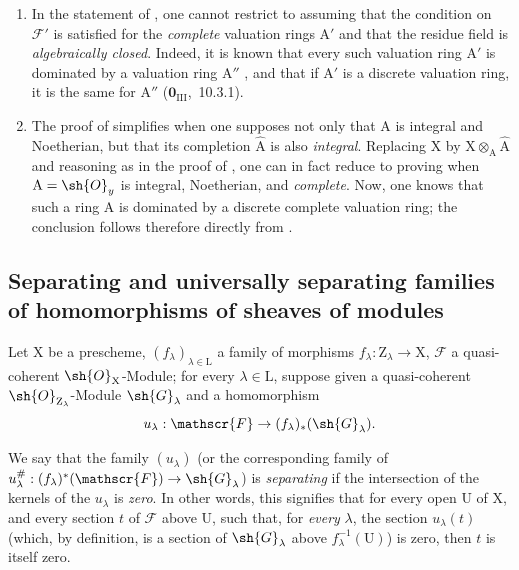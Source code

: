 \begin{remarks}[11.8.2]
\label{IV.11.8.2}
\medskip\noindent
\begin{enumerate}[label=(\roman*)]
  \item In the statement of , one cannot restrict to assuming that the condition on $\mathscr{F}'$ is satisfied for the \emph{complete} valuation rings $\mathrm{A}'$ and that the residue field is \emph{algebraically closed}.
  Indeed, it is known that every such valuation ring $\mathrm{A}'$ is dominated by a valuation ring $\mathrm{A}''$ , and that if $\mathrm{A}'$ is a discrete valuation ring, it is the same for $\mathrm{A}''$ ($\mathbf{0}_{\mathrm{III}}$,~10.3.1).
  \item The proof of  simplifies when one supposes not only that $\mathrm{A}$ is integral and Noetherian, but that its completion $\hat{\mathrm{A}}$ is also \emph{integral}.
  Replacing $\mathrm{X}$ by $\mathrm{X}\otimes_\mathrm{A}\hat{\mathrm{A}}$ and reasoning as in the proof of , one can in fact reduce to proving  when $\mathrm{A}=\sh{O}_y$ is integral, Noetherian, and \emph{complete}.
  Now, one knows  that such a ring $\mathrm{A}$ is dominated by a discrete complete valuation ring; the conclusion follows therefore directly from .
\end{enumerate}
\end{remarks}

\subsection{Separating and universally separating families of homomorphisms of sheaves of modules}
\label{subsection:IV.11.9}

\begin{env}[11.9.1]
\label{IV.11.9.1}
Let $\mathrm{X}$ be a prescheme, $(f_\lambda)_{\lambda\in\mathrm{L}}$ a family of morphisms $f_\lambda:\mathrm{Z}_\lambda\to\mathrm{X}$, $\mathscr{F}$ a quasi-coherent $\sh{O}_\mathrm{X}$-Module; for every $\lambda\in\mathrm{L}$, suppose given a quasi-coherent $\sh{O}_{\mathrm{Z}_\lambda}$-Module $\sh{G}_\lambda$ and a homomorphism
\[
  u_\lambda:\mathscr{F}\to(f_\lambda)_*(\sh{G}_\lambda).
\label{IV.11.9.1.1}
\]
\end{env}

We say that the family $(u_\lambda)$ (or the corresponding family of $u_\lambda^{\#}:(f_\lambda)^*(\mathscr{F})\to\sh{G}_\lambda$) is \emph{separating} if the intersection of the kernels of the $u_\lambda$ is \emph{zero}.
In other words, this signifies that for every open $\mathrm{U}$ of $\mathrm{X}$, and every section $t$ of $\mathscr{F}$ above $\mathrm{U}$, such that, for \emph{every} $\lambda$, the section $u_\lambda(t)$ (which, by definition, is a section of $\sh{G}_\lambda$ above $f_\lambda^{-1}(\mathrm{U})$) is zero, then $t$ is itself zero.

